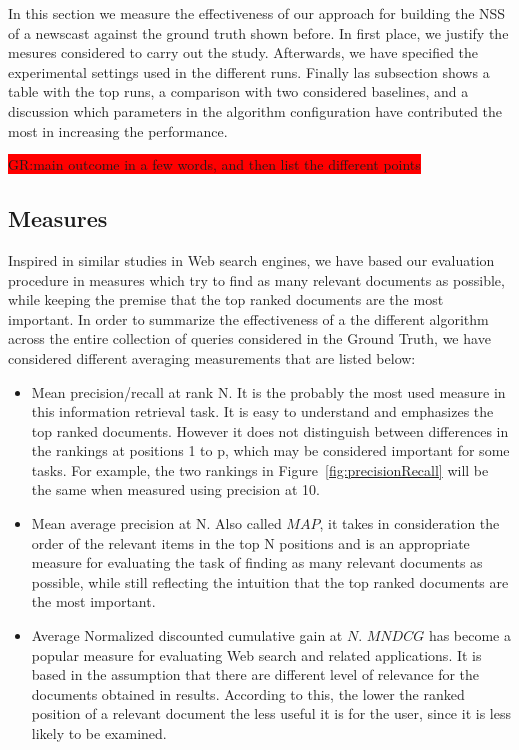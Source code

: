 \documentclass{llncs}
\newcommand{\todo}[1]{\colorbox{red}{#1}}
\begin{document}
In this section we measure the effectiveness of our approach for building the NSS of a newscast against the ground truth shown before. In first place, we justify the mesures considered to carry out the study. Afterwards, we have specified the experimental settings used in the different runs. Finally las subsection shows a table with the top runs, a comparison with two considered baselines, and a discussion which parameters in the algorithm configuration have contributed the most in increasing the performance.

\todo{GR:main outcome in a few words, and then list the different points}

\subsection{Measures}

Inspired in similar studies in Web search engines, we have based our evaluation procedure in measures which try to find as many relevant documents as possible, while  keeping the premise that the top ranked documents are the most important. In order to summarize the effectiveness of a the different algorithm across the entire collection of queries considered in the Ground Truth, we have considered different averaging measurements that are listed below:

 \begin{itemize}
\item Mean precision/recall at rank N. It is the probably the most used measure in this information retrieval task. It is easy to understand and emphasizes the top ranked documents. However it does not distinguish between differences in the rankings at positions 1 to p, which may be considered important for some tasks. For example, the two rankings in Figure~\ref{fig:precisionRecall} will be the same when measured using precision at 10.
\item Mean average precision at N. Also called $MAP$, it takes in consideration the order of the relevant items in the top N positions and is an appropriate measure for
evaluating the task of finding as many relevant documents as possible, while still reflecting the intuition that the top ranked documents are the most important.
\item Average Normalized discounted cumulative gain at $N$. $MNDCG$ has become a popular measure for evaluating Web search and related applications\cite{croft2010}. It is based in the assumption that there are different level of relevance for the documents obtained in results. According to this, the lower the ranked position of a relevant document the less useful it is for the user, since it is less likely to be examined. 
 \end{itemize}
\end{document}
